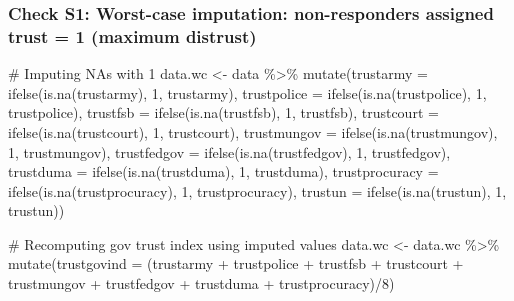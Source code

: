 \documentclass[
  letterpaper,
  DIV=11,
  numbers=noendperiod]{scrartcl}
\newenvironment{Shaded}{\begin{snugshade}}{\end{snugshade}}
\newcommand{\AttributeTok}[1]{\textcolor[rgb]{0.40,0.45,0.13}{#1}}
\newcommand{\CommentTok}[1]{\textcolor[rgb]{0.37,0.37,0.37}{#1}}
\newcommand{\DecValTok}[1]{\textcolor[rgb]{0.68,0.00,0.00}{#1}}
\newcommand{\FunctionTok}[1]{\textcolor[rgb]{0.28,0.35,0.67}{#1}}
\newcommand{\NormalTok}[1]{\textcolor[rgb]{0.00,0.23,0.31}{#1}}
\newcommand{\OtherTok}[1]{\textcolor[rgb]{0.00,0.23,0.31}{#1}}
\newcommand{\SpecialCharTok}[1]{\textcolor[rgb]{0.37,0.37,0.37}{#1}}
\begin{document}
\subsubsection{Check S1: Worst-case imputation: non-responders assigned
trust = 1 (maximum
distrust)}\label{check-s1-worst-case-imputation-non-responders-assigned-trust-1-maximum-distrust}

\begin{Shaded}
\begin{Highlighting}[]
\CommentTok{\# Imputing NAs with 1}
\NormalTok{data.wc }\OtherTok{\textless{}{-}}\NormalTok{ data }\SpecialCharTok{\%\textgreater{}\%} 
  \FunctionTok{mutate}\NormalTok{(}\AttributeTok{trustarmy =} \FunctionTok{ifelse}\NormalTok{(}\FunctionTok{is.na}\NormalTok{(trustarmy), }\DecValTok{1}\NormalTok{, trustarmy),}
         \AttributeTok{trustpolice =} \FunctionTok{ifelse}\NormalTok{(}\FunctionTok{is.na}\NormalTok{(trustpolice), }\DecValTok{1}\NormalTok{, trustpolice),}
         \AttributeTok{trustfsb =} \FunctionTok{ifelse}\NormalTok{(}\FunctionTok{is.na}\NormalTok{(trustfsb), }\DecValTok{1}\NormalTok{, trustfsb),}
         \AttributeTok{trustcourt =} \FunctionTok{ifelse}\NormalTok{(}\FunctionTok{is.na}\NormalTok{(trustcourt), }\DecValTok{1}\NormalTok{, trustcourt),}
         \AttributeTok{trustmungov =} \FunctionTok{ifelse}\NormalTok{(}\FunctionTok{is.na}\NormalTok{(trustmungov), }\DecValTok{1}\NormalTok{, trustmungov),}
         \AttributeTok{trustfedgov =} \FunctionTok{ifelse}\NormalTok{(}\FunctionTok{is.na}\NormalTok{(trustfedgov), }\DecValTok{1}\NormalTok{, trustfedgov),}
         \AttributeTok{trustduma =} \FunctionTok{ifelse}\NormalTok{(}\FunctionTok{is.na}\NormalTok{(trustduma), }\DecValTok{1}\NormalTok{, trustduma),}
         \AttributeTok{trustprocuracy =} \FunctionTok{ifelse}\NormalTok{(}\FunctionTok{is.na}\NormalTok{(trustprocuracy), }\DecValTok{1}\NormalTok{, trustprocuracy),}
         \AttributeTok{trustun =} \FunctionTok{ifelse}\NormalTok{(}\FunctionTok{is.na}\NormalTok{(trustun), }\DecValTok{1}\NormalTok{, trustun))}

\CommentTok{\# Recomputing gov trust index using imputed values}
\NormalTok{data.wc }\OtherTok{\textless{}{-}}\NormalTok{ data.wc }\SpecialCharTok{\%\textgreater{}\%} 
  \FunctionTok{mutate}\NormalTok{(}\AttributeTok{trustgovind =}\NormalTok{ (trustarmy }\SpecialCharTok{+}\NormalTok{ trustpolice }\SpecialCharTok{+}\NormalTok{ trustfsb }\SpecialCharTok{+}\NormalTok{ trustcourt }\SpecialCharTok{+} 
\NormalTok{                          trustmungov }\SpecialCharTok{+}\NormalTok{ trustfedgov }\SpecialCharTok{+}\NormalTok{ trustduma }\SpecialCharTok{+}
\NormalTok{                          trustprocuracy)}\SpecialCharTok{/}\DecValTok{8}\NormalTok{)}


\end{Highlighting}
\end{Shaded}
\end{document}
